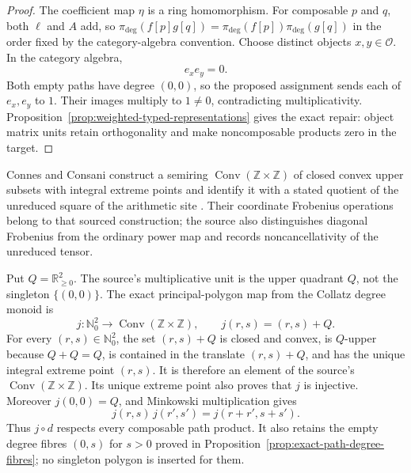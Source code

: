 \begin{proof}
The coefficient map $\eta$ is a ring homomorphism.  For composable $p$ and
$q$, both $\ell$ and $A$ add, so
$\pi_{\mathrm{deg}}(f[p]g[q])=
\pi_{\mathrm{deg}}(f[p])\pi_{\mathrm{deg}}(g[q])$ in the order fixed by the
category-algebra convention.  Choose distinct objects
$x,y\in\mathcal O$.  In the category algebra,
\[
 e_xe_y=0.
\]
Both empty paths have degree $(0,0)$, so the proposed assignment sends each
of $e_x,e_y$ to $1$.  Their images multiply to $1\ne0$, contradicting
multiplicativity.  Proposition~\ref{prop:weighted-typed-representations}
gives the exact repair: object matrix units retain orthogonality and make
noncomposable products zero in the target.
\end{proof}

\begin{sourceissue}
\label{sourceissue:arithmetic-site-nonidentification}
Connes and Consani construct a semiring
$\operatorname{Conv}(\mathbb Z\times\mathbb Z)$ of closed convex upper
subsets with integral extreme points and identify it with a stated quotient
of the unreduced square of the arithmetic site
\cite[source TeX lines 1151--1214 and 1364--1410]{ConnesConsani2015}.
Their coordinate Frobenius operations belong to that sourced construction;
the source also distinguishes diagonal Frobenius from the ordinary power map
and records noncancellativity of the unreduced tensor.

Put $Q=\mathbb R_{\geq0}^2$.  The source's multiplicative unit is the upper
quadrant $Q$, not the singleton $\{(0,0)\}$.  The exact principal-polygon map
from the Collatz degree monoid is
\begin{equation}
\label{eq:principal-upper-quadrant-map}
 j\colon\mathbb N_0^2\longrightarrow
   \operatorname{Conv}(\mathbb Z\times\mathbb Z),
 \qquad
 j(r,s)=(r,s)+Q.
\end{equation}
For every $(r,s)\in\mathbb N_0^2$, the set $(r,s)+Q$ is closed and convex,
is $Q$-upper because $Q+Q=Q$, is contained in the translate $(r,s)+Q$, and
has the unique integral extreme point $(r,s)$.  It is therefore an element of
the source's $\operatorname{Conv}(\mathbb Z\times\mathbb Z)$.  Its unique
extreme point also proves that $j$ is injective.  Moreover $j(0,0)=Q$, and
Minkowski multiplication gives
\[
 j(r,s)\,j(r',s')=j(r+r',s+s').
\]
Thus $j\circ d$ respects every composable path product.  It also retains the
empty degree fibres $(0,s)$ for $s>0$ proved in
Proposition~\ref{prop:exact-path-degree-fibres}; no singleton polygon is
inserted for them.


\end{sourceissue}

